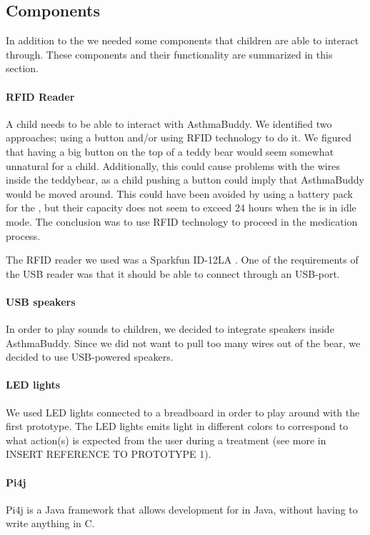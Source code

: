   
\subsection{Components}
In addition to the \rpi{} we needed some components that children are able to interact through. These components and their functionality are summarized in this section. 


\paragraph{RFID Reader}
A child needs to be able to interact with AsthmaBuddy. We identified two approaches; using a button and/or using RFID technology to do it. We figured that having a big button on the top of a teddy bear would seem somewhat unnatural for a child. Additionally, this could cause problems with the wires inside the teddybear, as a child pushing a button could imply that AsthmaBuddy would be moved around. This could have been avoided by using a battery pack for the \rpi{}, but their capacity does not seem to exceed 24 hours when the \rpi{} is in idle mode. The conclusion was to use RFID technology to proceed in the medication process.


The RFID reader we used was a Sparkfun ID-12LA . One of the requirements of the USB reader was that it should be able to connect through an USB-port. 
         
\paragraph{USB speakers}
In order to play sounds to children, we decided to integrate speakers inside AsthmaBuddy. Since we did not want to pull too many wires out of the bear, we decided to use USB-powered speakers.    

\paragraph{LED lights}
We used LED lights connected to a breadboard in order to play around with the first prototype. The LED lights emits light in different colors to correspond to what action(s) is expected from the user during a treatment (see more in INSERT REFERENCE TO PROTOTYPE 1).

\paragraph{Pi4j}
Pi4j is a Java framework that allows development for \rpi{} in Java, without having to write anything in C. 

